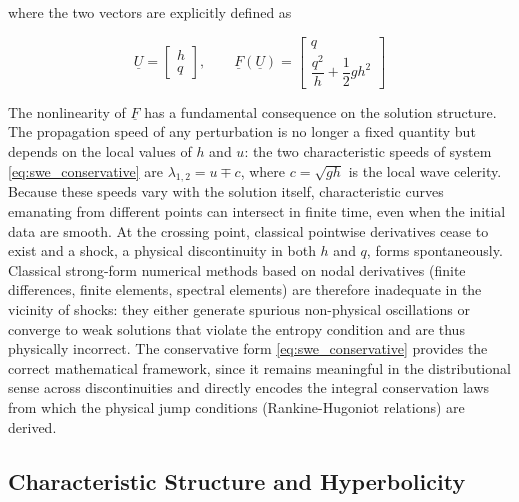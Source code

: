 where the two vectors are explicitly defined as

\begin{equation}
\underline{U} = 
\begin{bmatrix} 
h \\ 
q 
\end{bmatrix}, 
\qquad 
\underline{F}(\underline{U}) = 
\begin{bmatrix} 
q \\ 
\dfrac{q^2}{h} + \dfrac{1}{2}gh^2 
\end{bmatrix}
\label{eq:swe_vectors}
\end{equation}

The nonlinearity of \( \underline{F} \) has a fundamental consequence on the solution structure. The propagation speed of any perturbation is no longer a fixed quantity but depends on the local values of \( h \) and \( u \): the two characteristic speeds of system \eqref{eq:swe_conservative} are \( \lambda_{1,2} = u \mp c \), where \( c = \sqrt{gh} \) is the local wave celerity. Because these speeds vary with the solution itself, characteristic curves emanating from different points can intersect in finite time, even when the initial data are smooth. At the crossing point, classical pointwise derivatives cease to exist and a shock, a physical discontinuity in both \( h \) and \( q \), forms spontaneously. Classical strong-form numerical methods based on nodal derivatives (finite differences, finite elements, spectral elements) are therefore inadequate in the vicinity of shocks: they either generate spurious non-physical oscillations or converge to weak solutions that violate the entropy condition and are thus physically incorrect. The conservative form \eqref{eq:swe_conservative} provides the correct mathematical framework, since it remains meaningful in the distributional sense across discontinuities and directly encodes the integral conservation laws from which the physical jump conditions (Rankine-Hugoniot relations) are derived.

\subsection{Characteristic Structure and Hyperbolicity}

